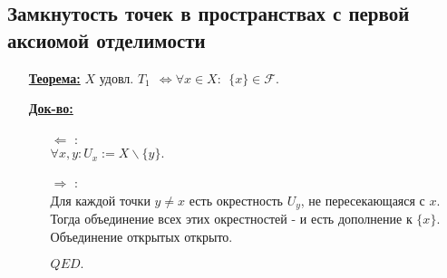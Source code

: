 \documentclass[10pt]{report}
\begin{document}
\begin{spacing}{1.5}
\subsection{Замкнутость точек в пространствах с первой аксиомой отделимости}

\begin{enumerate}
\item[\textbf{\underline{Теорема:}}]  $X$ удовл. $T_{1}~~\Leftrightarrow \forall x\in X:~~\lbrace x\rbrace \in \mathcal{F}.$
\item[\textbf{\underline{Док-во:}}]
\begin{enumerate}
\item[\underline{$\Leftarrow$}]:\\
$\forall x, y: U_{x}:=X\backslash\lbrace y\rbrace .$
\item[\underline{$\Rightarrow$}]:\\
Для каждой точки $y\neq x$ есть окрестность $U_{y}$, не пересекающаяся с $x$. Тогда объединение всех этих окрестностей - и есть дополнение к $\lbrace x\rbrace$. Объединение открытых открыто.
\begin{flushright}
$QED.$
\end{flushright}
\end{enumerate}
\end{enumerate}

\end{spacing}
\end{document}
